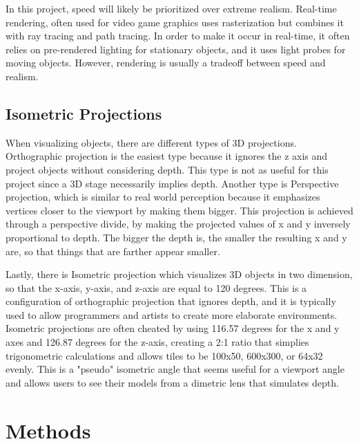 \documentclass[10pt,twocolumn]{article}
\begin{document}
In this project, speed will likely be prioritized over extreme realism. Real-time rendering, often used for video game graphics uses rasterization but combines it with ray tracing and path tracing. In order to make it occur in real-time, it often relies on pre-rendered lighting for stationary objects, and it uses light probes for moving objects. However, rendering is usually a tradeoff between speed and realism. 

\subsection{Isometric Projections}

When visualizing objects, there are different types of 3D projections. Orthographic projection is the easiest type because it ignores the z axis and project objects without considering depth. This type is not as useful for this project since a 3D stage necessarily implies depth. Another type is Perspective projection, which is similar to real world perception because it emphasizes vertices closer to the viewport by making them bigger. This projection is achieved through a perspective divide, by making the projected values of x and y inversely proportional to depth. The bigger the depth is, the smaller the resulting x and y are, so that things that are farther appear smaller.

Lastly, there is Isometric projection which visualizes 3D objects in two dimension, so that the x-axis, y-axis, and z-axis are equal to 120 degrees. This is a configuration of orthographic projection that ignores depth, and it is typically used to allow programmers and artists to create more elaborate environments. Isometric projections are often cheated by using 116.57 degrees for the x and y axes and 126.87 degrees for the z-axis, creating a 2:1 ratio that simplies trigonometric calculations and allows tiles to be 100x50, 600x300, or 64x32 evenly. This is a "pseudo" isometric angle that seems useful for a viewport angle and allows users to see their models from a dimetric lens that simulates depth.  

\section{Methods}
\end{document}
